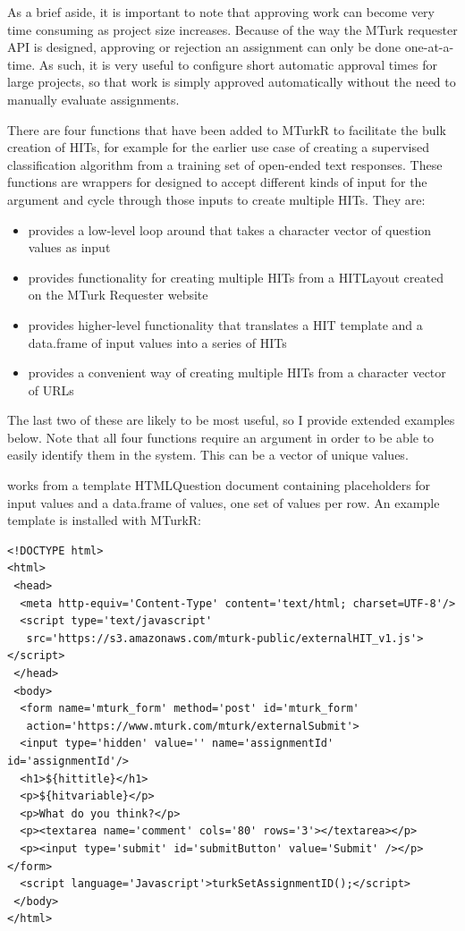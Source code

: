 As a brief aside, it is important to note that approving work can become very time consuming as project size increases. Because of the way the MTurk requester API is designed, approving or rejection an assignment can only be done one-at-a-time. As such, it is very useful to configure short automatic approval times for large projects, so that work is simply approved automatically without the need to manually evaluate assignments.

There are four functions that have been added to MTurkR to facilitate the bulk creation of HITs, for example for the earlier use case of creating a supervised classification algorithm from a training set of open-ended text responses. These functions are wrappers for  designed to accept different kinds of input for the  argument and cycle through those inputs to create multiple HITs. They are: 

\begin{itemize}
\item {} provides a low-level loop around  that takes a character vector of question values as input
\item {} provides functionality for creating multiple HITs from a HITLayout created on the MTurk Requester website
\item {} provides higher-level functionality that translates a HIT template and a data.frame of input values into a series of HITs
\item {} provides a convenient way of creating multiple HITs from a character vector of URLs
\end{itemize}

\noindent The last two of these are likely to be most useful, so I provide extended examples below. Note that all four functions require an  argument in order to be able to easily identify them in the system. This can be a vector of unique values.

 works from a template HTMLQuestion document containing placeholders for input values and a data.frame of values, one set of values per row. An example template is installed with MTurkR:

\begin{verbatim}
<!DOCTYPE html>
<html>
 <head>
  <meta http-equiv='Content-Type' content='text/html; charset=UTF-8'/>
  <script type='text/javascript' 
   src='https://s3.amazonaws.com/mturk-public/externalHIT_v1.js'></script>
 </head>
 <body>
  <form name='mturk_form' method='post' id='mturk_form' 
   action='https://www.mturk.com/mturk/externalSubmit'>
  <input type='hidden' value='' name='assignmentId' id='assignmentId'/>
  <h1>${hittitle}</h1>
  <p>${hitvariable}</p>
  <p>What do you think?</p>
  <p><textarea name='comment' cols='80' rows='3'></textarea></p>
  <p><input type='submit' id='submitButton' value='Submit' /></p></form>
  <script language='Javascript'>turkSetAssignmentID();</script>
 </body>
</html>
\end{verbatim}

